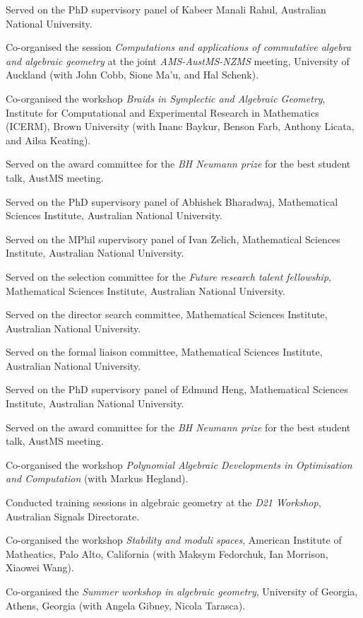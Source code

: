 \documentclass[11pt]{article}
\begin{document}
\begin{description}
Served on the PhD supervisory panel of Kabeer Manali Rahul, Australian National University.
\item[{2024}] Co-organised the session \emph{Computations and applications of commutative algebra and algebraic geometry} at the joint \emph{AMS-AustMS-NZMS} meeting, University of Auckland (with John Cobb, Sione Ma'u, and Hal Schenk).
\item[{2022}] Co-organised the workshop \emph{Braids in Symplectic and Algebraic Geometry}, Institute for Computational and Experimental Research in Mathematics (ICERM), Brown University (with Inanc Baykur, Benson Farb, Anthony Licata, and Ailsa Keating).
\item[{2021}] Served on the award committee for the \emph{BH Neumann prize} for the best student talk, AustMS meeting.
\item[{2020}] Served on the PhD supervisory panel of Abhishek Bharadwaj, Mathematical Sciences Institute, Australian National University.

Served on the MPhil supervisory panel of Ivan Zelich, Mathematical Sciences Institute, Australian National University.
\item[{2019}] Served on the selection committee for the \emph{Future research talent fellowship}, Mathematical Sciences Institute, Australian National University.

Served on the director search committee, Mathematical Sciences Institute, Australian National University.

Served on the formal liaison committee, Mathematical Sciences Institute, Australian National University.
\item[{2018}] Served on the PhD supervisory panel of Edmund Heng, Mathematical Sciences Institute, Australian National University.

Served on the award committee for the \emph{BH Neumann prize} for the best student talk, AustMS meeting.

Co-organised the workshop \emph{Polynomial Algebraic Developments in Optimisation and Computation} (with Markus Hegland).

Conducted training sessions in algebraic geometry at the \emph{D21 Workshop}, Australian Signals Directorate.
\item[{2017}] Co-organised the workshop \emph{Stability and moduli spaces}, American Institute of Matheatics, Palo Alto, California (with Maksym Fedorchuk, Ian Morrison, Xiaowei Wang).
\item[{2016}] Co-organised the \emph{Summer workshop in algebraic geometry}, University of Georgia, Athens, Georgia (with Angela Gibney, Nicola Tarasca).


\end{description}
\end{document}
